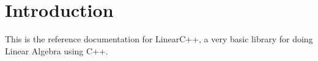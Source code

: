 \hypertarget{index_intro_sec}{}\section{Introduction}\label{index_intro_sec}
This is the reference documentation for LinearC++, a very basic library for doing Linear Algebra using C++. 